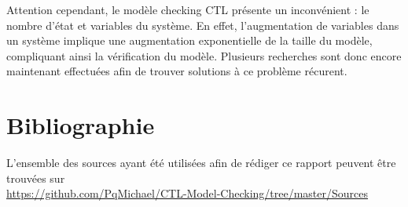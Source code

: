 \documentclass[runningheads,a4paper]{llncs}
\begin{document}
\noindent Attention cependant, le modèle checking CTL présente un inconvénient : le nombre d'état et variables du système. En effet, l'augmentation de variables dans un système implique une augmentation exponentielle de la taille du modèle, compliquant ainsi la vérification du modèle.
Plusieurs recherches sont donc encore maintenant effectuées afin de trouver solutions à ce problème récurent.

\section{Bibliographie}

L'ensemble des sources ayant été utilisées afin de rédiger ce rapport peuvent être trouvées sur\\ \url{https://github.com/PqMichael/CTL-Model-Checking/tree/master/Sources}
\end{document}
